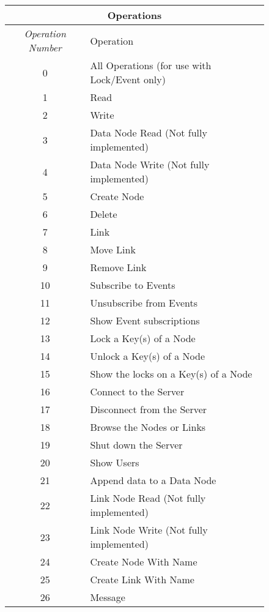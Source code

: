 \begin{figure}[htpb]
  \begin{center}
    \begin{tabular} {|c|l|} \hline
      \multicolumn{2}{|c|}{{\bf Operations}} \\ \hline {\em Operation
      Number} & {Operation}\\  \hline \hline
      0 & All Operations (for use with Lock/Event only)\\ \hline
      1 & Read \\ \hline
      2 & Write \\ \hline
      3 & Data Node Read (Not fully implemented) \\ \hline
      4 & Data Node Write (Not fully implemented) \\ \hline
      5 & Create Node \\ \hline
      6 & Delete \\ \hline
      7 & Link \\ \hline
      8 & Move Link \\ \hline
      9 & Remove Link \\ \hline
      10 & Subscribe to Events \\ \hline
      11 & Unsubscribe from Events \\ \hline
      12 & Show Event subscriptions \\ \hline
      13 & Lock a Key(s) of a Node \\ \hline
      14 & Unlock a Key(s) of a Node \\ \hline
      15 & Show the locks on a Key(s) of a Node \\ \hline
      16 & Connect to the Server \\ \hline
      17 & Disconnect from the Server \\ \hline
      18 & Browse the Nodes or Links \\ \hline
      19 & Shut down the Server \\ \hline
      20 & Show Users \\ \hline
      21 & Append data to a Data Node \\ \hline
      22 & Link Node Read (Not fully implemented) \\ \hline
      23 & Link Node Write (Not fully implemented) \\ \hline
      24 & Create Node With Name \\ \hline
      25 & Create Link With Name \\ \hline
      26 & Message \\ \hline

\end{tabular}
\end{center}
\end{figure}

